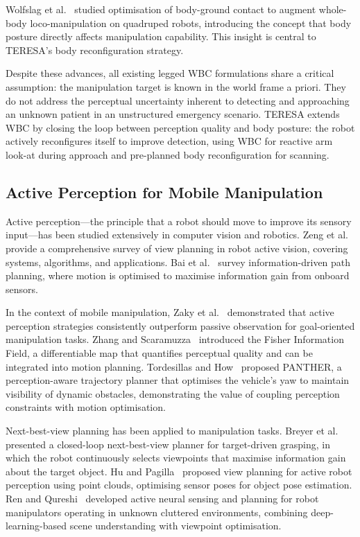 Wolfslag et al.~\cite{wolfslag2020} studied optimisation of body-ground
contact to augment whole-body loco-manipulation on quadruped robots,
introducing the concept that body posture directly affects manipulation
capability. This insight is central to \ac{TERESA}'s body reconfiguration
strategy.

Despite these advances, all existing legged \ac{WBC} formulations share a
critical assumption: the manipulation target is known in the world frame a
priori. They do not address the perceptual uncertainty inherent to detecting
and approaching an unknown patient in an unstructured emergency scenario.
\ac{TERESA} extends \ac{WBC} by closing the loop between perception quality
and body posture: the robot actively reconfigures itself to improve
detection, using \ac{WBC} for reactive arm look-at during approach and
pre-planned body reconfiguration for scanning.

\subsection{Active Perception for Mobile Manipulation}

Active perception---the principle that a robot should move to improve its
sensory input---has been studied extensively in computer vision and robotics.
Zeng et al.~\cite{zeng2020} provide a comprehensive survey of view planning
in robot active vision, covering systems, algorithms, and applications. Bai
et al.~\cite{bai2021} survey information-driven path planning, where motion
is optimised to maximise information gain from onboard sensors.

In the context of mobile manipulation, Zaky et al.~\cite{zaky2020}
demonstrated that active perception strategies consistently outperform
passive observation for goal-oriented manipulation tasks. Zhang and
Scaramuzza~\cite{zhang2020fisher} introduced the Fisher Information Field, a
differentiable map that quantifies perceptual quality and can be integrated
into motion planning. Tordesillas and How~\cite{tordesillas2022} proposed
PANTHER, a perception-aware trajectory planner that optimises the vehicle's
yaw to maintain visibility of dynamic obstacles, demonstrating the value of
coupling perception constraints with motion optimisation.

Next-best-view planning has been applied to manipulation tasks. Breyer et
al.~\cite{breyer2022} presented a closed-loop next-best-view planner for
target-driven grasping, in which the robot continuously selects viewpoints
that maximise information gain about the target object. Hu and
Pagilla~\cite{hu2022} proposed view planning for active robot perception
using point clouds, optimising sensor poses for object pose estimation. Ren
and Qureshi~\cite{ren2023} developed active neural sensing and planning for
robot manipulators operating in unknown cluttered environments, combining
deep-learning-based scene understanding with viewpoint optimisation.

